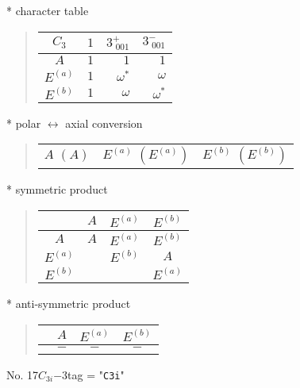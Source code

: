 \documentclass[fleqn,10pt,landscape]{jsarticle}
\begin{document}
* character table
\begin{quote}
\begin{tabular}{crrr} \hline \hline
$ C_{3} $ & $ 1 $ & $ 3^{+}_{\,\,001} $ & $ 3^{-}_{\,\,001} $ \\ \hline
$ A $ & $ 1 $ & $ 1 $ & $ 1 $ \\
$ E^{(a)} $ & $ 1 $ & $ \omega^{*} $ & $ \omega $ \\
$ E^{(b)} $ & $ 1 $ & $ \omega $ & $ \omega^{*} $ \\
 \hline \hline
\end{tabular}
\end{quote}
* polar $\leftrightarrow$ axial conversion
\begin{quote}
\begin{tabular}{ccc}
$ A\,\,(A) $ & $ E^{(a)}\,\,(E^{(a)}) $ & $ E^{(b)}\,\,(E^{(b)}) $
\end{tabular}
\end{quote}
* symmetric product
\begin{quote}
\begin{tabular}{c|ccc} \hline \hline
 & $ A $ & $ E^{(a)} $ & $ E^{(b)} $ \\ \hline
$ A $ & $ A $ & $ E^{(a)} $ & $ E^{(b)} $ \\
$ E^{(a)} $ & $  $ & $ E^{(b)} $ & $ A $ \\
$ E^{(b)} $ & $  $ & $  $ & $ E^{(a)} $ \\
 \hline \hline
\end{tabular}
\end{quote}
* anti-symmetric product
\begin{quote}
\begin{tabular}{cccc} \hline \hline
 & $ A $ & $ E^{(a)} $ & $ E^{(b)} $ \\ \hline
$  $ & $ - $ & $ - $ & $ - $ \\
 \hline \hline
\end{tabular}
\end{quote}
\newpage
No. 17\quad$C_{3i}$\quad$-3$\quad[ trigonal ]
tag = "{\tt C3i}"
\end{document}

